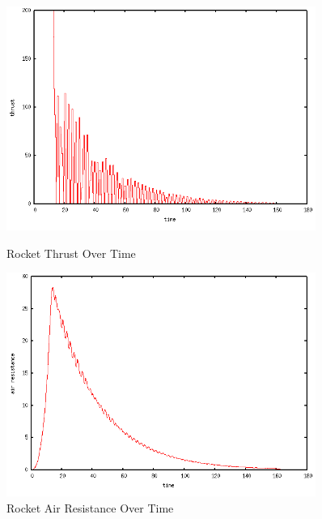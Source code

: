 \documentclass{article}
\begin{document}
\begin{figure}
\centering
\includegraphics[width=0.9\textwidth]{homework5a_thrust.png}
\caption{Rocket Thrust Over Time}
\vspace{2 cm}
\includegraphics[width=0.9\textwidth]{homework5a_air_resistance.png}
\caption{Rocket Air Resistance Over Time}
\end{figure}
\end{document}

